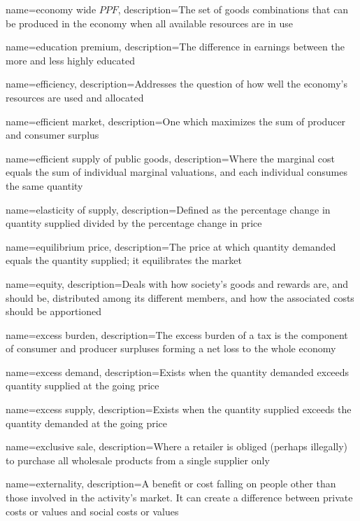 {
	name={economy wide $PPF$},
	description={The set of goods combinations that can be produced in the economy when all available resources are in use}
}

{
	name={education premium},
	description={The difference in earnings between the more and less highly educated}
}

{
	name=efficiency,
	description={Addresses the question of how well the economy's resources are used and allocated}
}

{
	name={efficient market},
	description={One which maximizes the sum of producer and consumer surplus}
}

{
	name={efficient supply of public goods},
	description={Where the marginal cost equals the sum of individual marginal valuations, and each individual consumes the same quantity}
}

{
	name={elasticity of supply},
	description={Defined as the percentage change in quantity supplied divided by the percentage change in price}
}

{
	name={equilibrium price},
	description={The price at which quantity demanded equals the quantity supplied; it equilibrates the market}
}

{
	name=equity,
	description={Deals with how society's goods and rewards are, and should be, distributed among its different members, and how the associated costs should be apportioned}
}

{
	name={excess burden},
	description={The excess burden of a tax is the component of consumer and producer surpluses forming a net loss to the whole economy}
}

{
	name={excess demand},
	description={Exists when the quantity demanded exceeds quantity supplied at the going price}
}

{
	name={excess supply},
	description={Exists when the quantity supplied exceeds the quantity demanded at the going price}
}

{
	name={exclusive sale},
	description={Where a retailer is obliged (perhaps illegally) to purchase all wholesale products from a single supplier only}
}

{
	name=externality,
	description={A benefit or cost falling on people other than those involved in the activity's market. It can create a difference between private costs or values and social costs or values}
}

